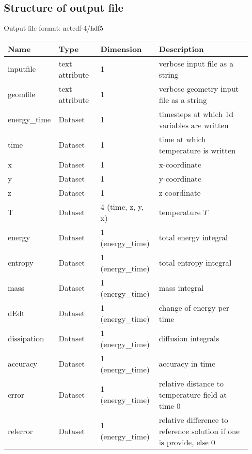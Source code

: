 \subsection{Structure of output file}
Output file format: netcdf-4/hdf5
%
\begin{longtable}{lll>{\RaggedRight}p{7cm}}
\toprule
\rowcolor{gray!50}\textbf{Name} &  \textbf{Type} & \textbf{Dimension} & \textbf{Description}  \\ \midrule
inputfile  &     text attribute & 1 & verbose input file as a string \\
geomfile   &     text attribute & 1 & verbose geometry input file as a string \\
energy\_time     & Dataset & 1 & timesteps at which 1d variables are written \\
time             & Dataset & 1 & time at which temperature is written \\
x                & Dataset & 1 & x-coordinate  \\
y                & Dataset & 1 & y-coordinate \\
z                & Dataset & 1 & z-coordinate \\
T                & Dataset & 4 (time, z, y, x) & temperature $T$ \\
energy           & Dataset & 1 (energy\_time) & total energy integral  \\
entropy          & Dataset & 1 (energy\_time) & total entropy integral  \\
mass             & Dataset & 1 (energy\_time) & mass integral   \\
dEdt             & Dataset & 1 (energy\_time) & change of energy per time  \\
dissipation      & Dataset & 1 (energy\_time) & diffusion integrals  \\
accuracy         & Dataset & 1 (energy\_time) & accuracy in time  \\
error            & Dataset & 1 (energy\_time) & relative distance to temperature field at time 0\\
relerror         & Dataset & 1 (energy\_time) & relative difference to reference solution if one is provide, else 0 \\
\bottomrule
\end{longtable}






